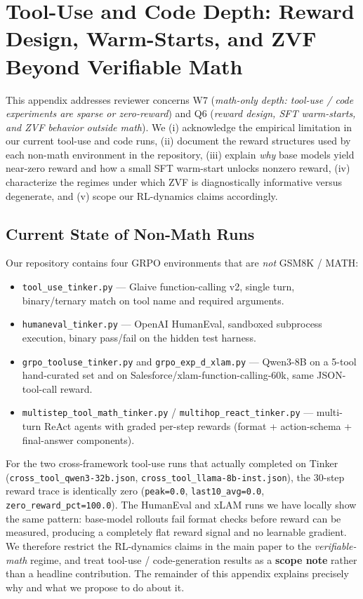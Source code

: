 \section{Tool-Use and Code Depth: Reward Design, Warm-Starts, and ZVF Beyond Verifiable Math}
\label{sec:appendix:tool-code-depth}

This appendix addresses reviewer concerns W7 (\emph{math-only depth:
tool-use / code experiments are sparse or zero-reward}) and Q6
(\emph{reward design, SFT warm-starts, and ZVF behavior outside math}).
We (i) acknowledge the empirical limitation in our current tool-use and
code runs, (ii) document the reward structures used by each
non-math environment in the repository, (iii) explain \emph{why} base
models yield near-zero reward and how a small SFT warm-start unlocks
nonzero reward, (iv) characterize the regimes under which ZVF is
diagnostically informative versus degenerate, and (v) scope our
RL-dynamics claims accordingly.

\subsection{Current State of Non-Math Runs}
\label{subsec:tool-code-state}

Our repository contains four GRPO environments that are \emph{not}
GSM8K / MATH:
\begin{itemize}
  \item \texttt{tool\_use\_tinker.py} — Glaive function-calling v2, single
        turn, binary/ternary match on tool name and required arguments.
  \item \texttt{humaneval\_tinker.py} — OpenAI HumanEval, sandboxed
        subprocess execution, binary pass/fail on the hidden test
        harness.
  \item \texttt{grpo\_tooluse\_tinker.py} and \texttt{grpo\_exp\_d\_xlam.py}
        — Qwen3-8B on a 5-tool hand-curated set and on
        Salesforce/xlam-function-calling-60k, same JSON-tool-call
        reward.
  \item \texttt{multistep\_tool\_math\_tinker.py} /
        \texttt{multihop\_react\_tinker.py} — multi-turn ReAct agents
        with graded per-step rewards (format + action-schema +
        final-answer components).
\end{itemize}

For the two cross-framework tool-use runs that actually completed on
Tinker (\texttt{cross\_tool\_qwen3-32b.json},
\texttt{cross\_tool\_llama-8b-inst.json}), the 30-step reward trace is
identically zero (\texttt{peak=0.0}, \texttt{last10\_avg=0.0},
\texttt{zero\_reward\_pct=100.0}). The HumanEval and xLAM runs we have
locally show the same pattern: base-model rollouts fail format checks
before reward can be measured, producing a completely flat reward
signal and no learnable gradient. We therefore restrict the RL-dynamics
claims in the main paper to the \emph{verifiable-math} regime, and
treat tool-use / code-generation results as a \textbf{scope note}
rather than a headline contribution. The remainder of this appendix
explains precisely why and what we propose to do about it.

